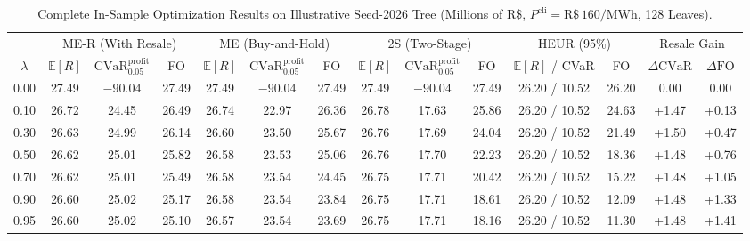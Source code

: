 \documentclass[10pt,journal]{IEEEtran}
\begin{document}
\begin{table}[htbp]
\centering
\caption{Complete In-Sample Optimization Results on Illustrative Seed-2026 Tree (Millions of R\$, $P^{\text{cli}} = \text{R\$}\,160/\text{MWh}$, 128 Leaves).}
\label{tab:supp_full7}
\footnotesize
\setlength{\tabcolsep}{2.5pt}
\begin{tabular}{cccccccccccccc}
\toprule
 & \multicolumn{3}{c}{ME-R (With Resale)} & \multicolumn{3}{c}{ME (Buy-and-Hold)} & \multicolumn{3}{c}{2S (Two-Stage)} & \multicolumn{2}{c}{HEUR (95\%)} & \multicolumn{2}{c}{Resale Gain} \\
\cmidrule(lr){2-4} \cmidrule(lr){5-7} \cmidrule(lr){8-10} \cmidrule(lr){11-12} \cmidrule(lr){13-14}
$\lambda$ & $\mathbb{E}[R]$ & $\mathrm{CVaR}_{0.05}^{\mathrm{profit}}$ & FO & $\mathbb{E}[R]$ & $\mathrm{CVaR}_{0.05}^{\mathrm{profit}}$ & FO & $\mathbb{E}[R]$ & $\mathrm{CVaR}_{0.05}^{\mathrm{profit}}$ & FO & $\mathbb{E}[R]$ / CVaR & FO & $\Delta \mathrm{CVaR}$ & $\Delta \mathrm{FO}$ \\
\midrule
0.00 & 27.49 & $-90.04$ & 27.49 & 27.49 & $-90.04$ & 27.49 & 27.49 & $-90.04$ & 27.49 & 26.20 / 10.52 & 26.20 & 0.00  & 0.00  \\
0.10 & 26.72 & 24.45    & 26.49 & 26.74 & 22.97    & 26.36 & 26.78 & 17.63    & 25.86 & 26.20 / 10.52 & 24.63 & +1.47 & +0.13 \\
0.30 & 26.63 & 24.99    & 26.14 & 26.60 & 23.50    & 25.67 & 26.76 & 17.69    & 24.04 & 26.20 / 10.52 & 21.49 & +1.50 & +0.47 \\
0.50 & 26.62 & 25.01    & 25.82 & 26.58 & 23.53    & 25.06 & 26.76 & 17.70    & 22.23 & 26.20 / 10.52 & 18.36 & +1.48 & +0.76 \\
0.70 & 26.62 & 25.01    & 25.49 & 26.58 & 23.54    & 24.45 & 26.75 & 17.71    & 20.42 & 26.20 / 10.52 & 15.22 & +1.48 & +1.05 \\
0.90 & 26.60 & 25.02    & 25.17 & 26.58 & 23.54    & 23.84 & 26.75 & 17.71    & 18.61 & 26.20 / 10.52 & 12.09 & +1.48 & +1.33 \\
0.95 & 26.60 & 25.02    & 25.10 & 26.57 & 23.54    & 23.69 & 26.75 & 17.71    & 18.16 & 26.20 / 10.52 & 11.30 & +1.48 & +1.41 \\
\bottomrule
\end{tabular}
\end{table}
\end{document}

